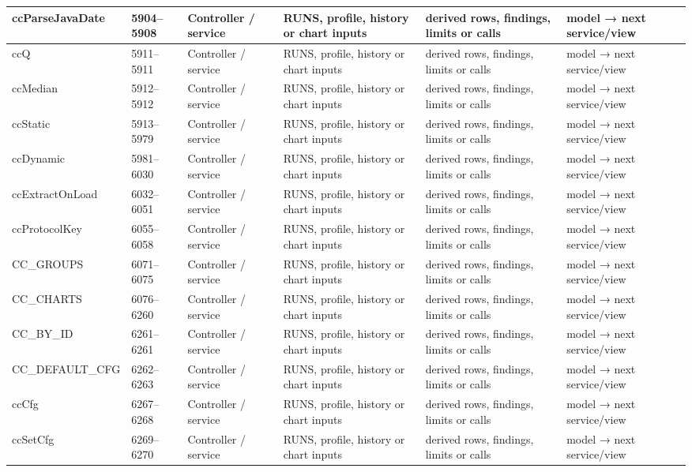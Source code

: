 \begin{landscape}
\begin{longtable}{@{}p{3.2cm}p{1.45cm}p{2.7cm}p{4.0cm}p{4.0cm}p{3.0cm}@{}}
ccParseJavaDate & 5904--5908 & Controller / service & RUNS, profile, history or chart inputs & derived rows, findings, limits or calls & model → next service/view \\\hline
ccQ & 5911--5911 & Controller / service & RUNS, profile, history or chart inputs & derived rows, findings, limits or calls & model → next service/view \\\hline
ccMedian & 5912--5912 & Controller / service & RUNS, profile, history or chart inputs & derived rows, findings, limits or calls & model → next service/view \\\hline
ccStatic & 5913--5979 & Controller / service & RUNS, profile, history or chart inputs & derived rows, findings, limits or calls & model → next service/view \\\hline
ccDynamic & 5981--6030 & Controller / service & RUNS, profile, history or chart inputs & derived rows, findings, limits or calls & model → next service/view \\\hline
ccExtractOnLoad & 6032--6051 & Controller / service & RUNS, profile, history or chart inputs & derived rows, findings, limits or calls & model → next service/view \\\hline
ccProtocolKey & 6055--6058 & Controller / service & RUNS, profile, history or chart inputs & derived rows, findings, limits or calls & model → next service/view \\\hline
CC\_GROUPS & 6071--6075 & Controller / service & RUNS, profile, history or chart inputs & derived rows, findings, limits or calls & model → next service/view \\\hline
CC\_CHARTS & 6076--6260 & Controller / service & RUNS, profile, history or chart inputs & derived rows, findings, limits or calls & model → next service/view \\\hline
CC\_BY\_ID & 6261--6261 & Controller / service & RUNS, profile, history or chart inputs & derived rows, findings, limits or calls & model → next service/view \\\hline
CC\_DEFAULT\_CFG & 6262--6263 & Controller / service & RUNS, profile, history or chart inputs & derived rows, findings, limits or calls & model → next service/view \\\hline
ccCfg & 6267--6268 & Controller / service & RUNS, profile, history or chart inputs & derived rows, findings, limits or calls & model → next service/view \\\hline
ccSetCfg & 6269--6270 & Controller / service & RUNS, profile, history or chart inputs & derived rows, findings, limits or calls & model → next service/view \\\hline

\end{longtable}
\end{landscape}
